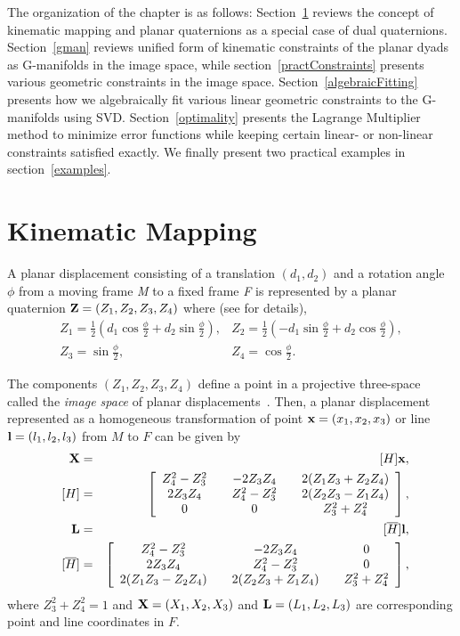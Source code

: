 The organization of the chapter is as follows: Section~\ref{kinmap} reviews the concept of kinematic mapping and planar quaternions as a special case of dual quaternions. Section~\ref{gman} reviews unified form of kinematic constraints of the planar dyads as G-manifolds in the image space, while section~\ref{practConstraints} presents various geometric constraints in the image space. Section~\ref{algebraicFitting} presents how we  algebraically fit various linear geometric constraints to the G-manifolds using SVD. Section~\ref{optimality} presents the Lagrange Multiplier method to minimize error functions while keeping certain linear- or non-linear constraints satisfied exactly. We finally present two practical examples in section~\ref{examples}.

\section{Kinematic Mapping}\label{kinmap}
A planar displacement consisting of a translation $(d_1,d_2)$ and a rotation  angle $\phi$ from a moving frame \textit{M} to a fixed frame \textit{F} is represented by a planar quaternion
 ${\bf Z}=(Z_1,Z_2,Z_3,Z_4)$ where (see \cite{ravani83,McCarthy90} for details),
\begin{equation}\label{z12}
\begin{array}{ll}
Z_1=\frac{1}{2}(d_1\cos\frac{\phi}{2}+d_2\sin\frac{\phi}{2}),  & Z_2=\frac{1}{2}(-d_1\sin\frac{\phi}{2}+d_2\cos\frac{\phi}{2}), \\
Z_3=\sin\frac{\phi}{2}, & Z_4= \cos\frac{\phi}{2}.
\end{array}
\end{equation}


The components $(Z_1,Z_2,Z_3,Z_4)$  define a point in a projective three-space called the {\it image space} of planar displacements~\cite{ravani83}.
Then, a planar displacement represented as a homogeneous transformation of point ${\bf x}=(x_1,x_2,x_3)$ or line  ${\bf l}=(l_1,l_2, l_3)$ from $M$ to $F$ can be given by
\begin{eqnarray}
{\bf X} &= &[H]{\bf x} \label{pointT}, \\ \nonumber \ \   [H] & = &\left[
\begin{array}{ccccc}
Z_4^2-Z_3^2 &  & -2Z_3Z_4 &  & 2(Z_1Z_3+Z_2Z_4) \\
2Z_3Z_4 &  & Z_4^2-Z_3^2 &  & 2(Z_2Z_3-Z_1Z_4) \\
0 &  & 0 &  & Z_3^2+Z_4^2
\end{array}
\right],\\
{\bf L} &=& [\overline{H}] {\bf l}\label{L2}, \\ \nonumber \ \  [\overline{H}] &=& \left[
\begin{array}{ccccc}
Z_4^2-Z_3^2 &  & -2Z_3Z_4 &  & 0\\
2Z_3Z_4 &  & Z_4^2-Z_3^2 &  & 0 \\
2(Z_1Z_3-Z_2Z_4)  & &  2(Z_2Z_3+Z_1Z_4)  & & Z_3^2+Z_4^2
\end{array}
\right],
\end{eqnarray}
where $Z_3^2+Z_4^2=1$ and ${\bf X}=(X_1,X_2,X_3)$ and ${\bf L}=(L_1,L_2,L_3)$ are corresponding point and line coordinates in $F$.


